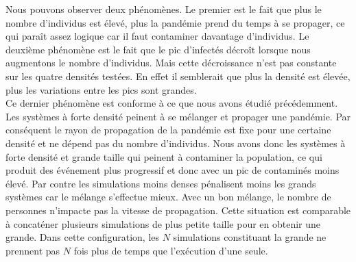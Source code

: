 Nous pouvons observer deux phénomènes. Le premier est le fait que plus le nombre d'individus est élevé, plus la pandémie prend du temps à se propager, ce qui paraît assez logique car il faut contaminer davantage d'individus. Le deuxième phénomène est le fait que le pic d'infectés décroît lorsque nous augmentons le nombre d'individus. Mais cette décroissance n'est pas constante sur les quatre densités testées. En effet il semblerait que plus la densité est élevée, plus les variations entre les pics sont grandes.\\

Ce dernier phénomène est conforme à ce que nous avons étudié précédemment. Les systèmes à forte densité peinent à se mélanger et propager une pandémie. Par conséquent le rayon de propagation de la pandémie est fixe pour une certaine densité et ne dépend pas du nombre d'individus. Nous avons donc les systèmes à forte densité et grande taille qui peinent à contaminer la population, ce qui produit des événement plus progressif et donc avec un pic de contaminés moins élevé. Par contre les simulations moins denses pénalisent moins les grands systèmes car le mélange s'effectue mieux. Avec un bon mélange, le nombre de personnes n'impacte pas la vitesse de propagation. Cette situation est comparable à concaténer plusieurs simulations de plus petite taille pour en obtenir une grande. Dans cette configuration, les $N$ simulations constituant la grande ne prennent pas $N$ fois plus de temps que l'exécution d'une seule.
